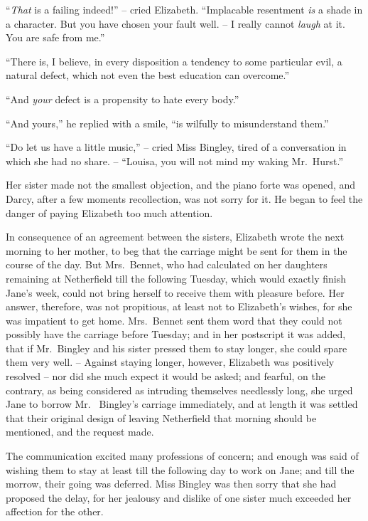 “\textit{That} is a failing indeed!” -- cried Elizabeth. “Implacable
resentment \textit{is} a shade in a character. But you
have chosen your fault well. -- I really cannot \textit{laugh} at it.
You are safe from me.”

“There is, I believe, in every disposition a tendency
to some particular evil, a natural defect, which not even
the best education can overcome.”

“And \textit{your} defect is a propensity to hate every body.”

“And yours,” he replied with a smile, “is wilfully to
misunderstand them.”

“Do let us have a little music,” -- cried Miss Bingley,
tired of a conversation in which she had no share. --
“Louisa, you will not mind my waking Mr.\ Hurst.”

Her sister made not the smallest objection, and the
piano forte was opened, and Darcy, after a few moments
recollection, was not sorry for it. He began to feel the
danger of paying Elizabeth too much attention.


In consequence of an agreement between the sisters,
Elizabeth wrote the next morning to her mother, to beg
that the carriage might be sent for them in the course
of the day. But Mrs.\ Bennet, who had calculated on her
daughters remaining at Netherfield till the following
Tuesday, which would exactly finish Jane’s week, could
not bring herself to receive them with pleasure before.
Her answer, therefore, was not propitious, at least not to
Elizabeth’s wishes, for she was impatient to get home.
Mrs.\ Bennet sent them word that they could not possibly
have the carriage before Tuesday; and in her postscript
it was added, that if Mr.\ Bingley and his sister pressed them
to stay longer, she could spare them very well. -- Against
staying longer, however, Elizabeth was positively resolved -- nor
did she much expect it would be asked; and fearful,
on the contrary, as being considered as intruding themselves
needlessly long, she urged Jane to borrow Mr.\ %
Bingley’s carriage immediately, and at length it was
settled that their original design of leaving Netherfield
that morning should be mentioned, and the request made.

The communication excited many professions of concern;
and enough was said of wishing them to stay at least till
the following day to work on Jane; and till the morrow,
their going was deferred. Miss Bingley was then sorry that
she had proposed the delay, for her jealousy and dislike
of one sister much exceeded her affection for the other.

